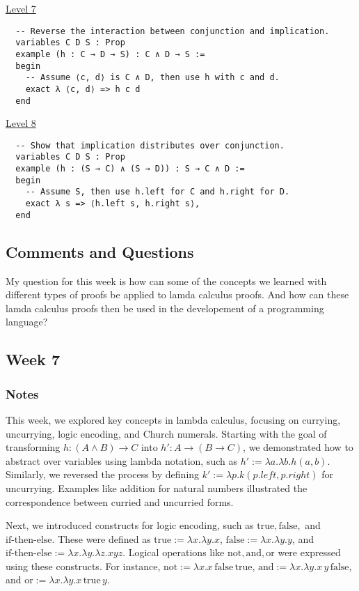 \documentclass{article}
\theoremstyle{theorem}
\theoremstyle{definition}
\theoremstyle{remark}
\begin{document}
\medskip\noindent\centerline{\underline{Level 7}}

\begin{verbatim}
  -- Reverse the interaction between conjunction and implication.
  variables C D S : Prop
  example (h : C → D → S) : C ∧ D → S :=
  begin
    -- Assume ⟨c, d⟩ is C ∧ D, then use h with c and d.
    exact λ ⟨c, d⟩ => h c d
  end
\end{verbatim}

\medskip\noindent\centerline{\underline{Level 8}}

\begin{verbatim}
  -- Show that implication distributes over conjunction.
  variables C D S : Prop
  example (h : (S → C) ∧ (S → D)) : S → C ∧ D :=
  begin
    -- Assume S, then use h.left for C and h.right for D.
    exact λ s => ⟨h.left s, h.right s⟩,
  end
\end{verbatim}

\subsection*{Comments and Questions}

My question for this week is how can some of the concepts we learned with different types of proofs be applied to lamda calculus proofs. And how can these lamda calculus proofs then be used in the developement of a programming language?

\subsection{Week 7}

\subsubsection*{Notes}
This week, we explored key concepts in lambda calculus, focusing on currying, uncurrying, logic encoding, and Church numerals. Starting with the goal of transforming \( h : (A \land B) \to C \) into \( h' : A \to (B \to C) \), we demonstrated how to abstract over variables using lambda notation, such as \( h' := \lambda a. \lambda b. h(a, b) \). Similarly, we reversed the process by defining \( k' := \lambda p. k(p.left, p.right) \) for uncurrying. Examples like addition for natural numbers illustrated the correspondence between curried and uncurried forms.

Next, we introduced constructs for logic encoding, such as \( \text{true}, \text{false}, \) and \( \text{if-then-else} \). These were defined as \( \text{true} := \lambda x. \lambda y. x \), \( \text{false} := \lambda x. \lambda y. y \), and \( \text{if-then-else} := \lambda x. \lambda y. \lambda z. xyz \). Logical operations like \( \text{not}, \text{and}, \text{or} \) were expressed using these constructs. For instance, \( \text{not} := \lambda x. x \, \text{false} \, \text{true} \), \( \text{and} := \lambda x. \lambda y. x \, y \, \text{false} \), and \( \text{or} := \lambda x. \lambda y. x \, \text{true} \, y \).
\end{document}
